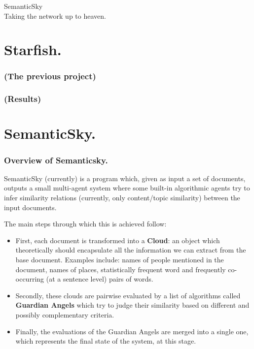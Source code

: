 \documentclass[11pt]{article}
\begin{document}
\begin{center}
\huge{SemanticSky} \\ \large{Taking the network up to heaven.}
\end{center}

\tableofcontents
\clearpage

\part{Starfish.}

\section{(The previous project)}

\section{(Results)}



\part{SemanticSky.}

\section{Overview of Semanticsky.}

SemanticSky (currently) is a program which, given as input a set of documents, outputs a small multi-agent system where some built-in algorithmic agents try to infer similarity relations (currently, only content/topic similarity) between the input documents.

The main steps through which this is achieved follow:

\begin{itemize}
\item First, each document is transformed into a {\bf Cloud}: an object which theoretically should encapsulate all the information we can extract from the base document. Examples include: names of people mentioned in the document, names of places, statistically frequent word and frequently co-occurring (at a sentence level) pairs of words.
\item  Secondly, these clouds are pairwise evaluated by a list of algorithms called {\bf Guardian Angels} which try to judge their similarity based on different and possibly complementary criteria.
\item Finally, the evaluations of the Guardian Angels are merged into a single one, which represents the final state of the system, at this stage.
\end{itemize}
\end{document}
